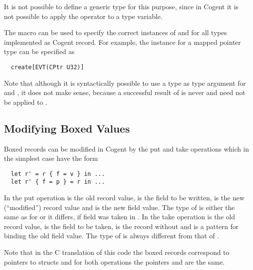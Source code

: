It is not possible to define a generic type for this purpose, since in Cogent it is not possible to apply the 
 operator to a type variable.

The macro can be used to specify the correct
instances of  and  for all types implemented as Cogent record. For example, the 
 instance for a mapped pointer type  can be specified as
\begin{verbatim}
  create[EVT(CPtr U32)]
\end{verbatim}

Note that although it is syntactically possible to use a type  as type argument for 
and , it does not make sense, because a successful result of  is never  and
 need not be applied to .

\subsection{Modifying Boxed Values}
\label{design-operations-modify}

Boxed records can be modified in Cogent by the put and take operations which in the simplest case have the form
\begin{verbatim}
  let r' = r { f = v } in ...
  let r' { f = p } = r in ...
\end{verbatim}
In the put operation  is the old record value,  is the field to be written,  is the 
new (``modified'') record value and  is the new field value. The type of  is either the same as 
for  or it differs, if field  was taken in . In the take operation  is the old record value,  
is the field to be taken,  is the record without  and  is a pattern for binding the old 
field value. The type of  is always different from that of .

Note that in the C translation of this code the boxed records correspond to pointers to structs and for both operations
the pointers  and  are the same.

